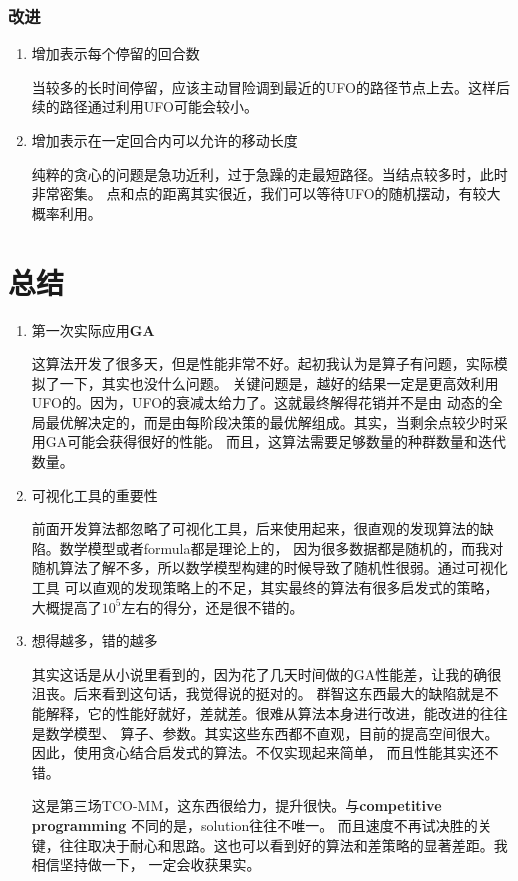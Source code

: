 \documentclass[hyperref,UTF8]{ctexart}
\theoremstyle{definition}
\theoremstyle{remark}
\numberwithin{equation}{subsection}
\newcommand{\Emph}{\textbf}
\begin{document}
\subsubsection{改进}

	\begin{enumerate}[(1)]
		
		\item 增加表示每个停留的回合数
		
		当较多的长时间停留，应该主动冒险调到最近的UFO的路径节点上去。这样后续的路径通过利用UFO可能会较小。
		
		\item 增加表示在一定回合内可以允许的移动长度
		
		纯粹的贪心的问题是急功近利，过于急躁的走最短路径。当结点较多时，此时非常密集。
		点和点的距离其实很近，我们可以等待UFO的随机摆动，有较大概率利用。
		
	\end{enumerate}

\section{总结}
	
	\begin{enumerate}[(1)]
		
		\item 第一次实际应用\Emph{GA}
		
		这算法开发了很多天，但是性能非常不好。起初我认为是算子有问题，实际模拟了一下，其实也没什么问题。
		关键问题是，越好的结果一定是更高效利用UFO的。因为，UFO的衰减太给力了。这就最终解得花销并不是由
		动态的全局最优解决定的，而是由每阶段决策的最优解组成。其实，当剩余点较少时采用GA可能会获得很好的性能。
		而且，这算法需要足够数量的种群数量和迭代数量。
		
		\item 可视化工具的重要性
		
		前面开发算法都忽略了可视化工具，后来使用起来，很直观的发现算法的缺陷。数学模型或者formula都是理论上的，
		因为很多数据都是随机的，而我对随机算法了解不多，所以数学模型构建的时候导致了随机性很弱。通过可视化工具
		可以直观的发现策略上的不足，其实最终的算法有很多启发式的策略，大概提高了$10^5$左右的得分，还是很不错的。
		
		\item 想得越多，错的越多
		
		其实这话是从小说里看到的，因为花了几天时间做的GA性能差，让我的确很沮丧。后来看到这句话，我觉得说的挺对的。
		群智这东西最大的缺陷就是不能解释，它的性能好就好，差就差。很难从算法本身进行改进，能改进的往往是数学模型、
		算子、参数。其实这些东西都不直观，目前的提高空间很大。因此，使用贪心结合启发式的算法。不仅实现起来简单，
		而且性能其实还不错。
		
		这是第三场TCO-MM，这东西很给力，提升很快。与\Emph{competitive programming} 不同的是，solution往往不唯一。
		而且速度不再试决胜的关键，往往取决于耐心和思路。这也可以看到好的算法和差策略的显著差距。我相信坚持做一下，
		一定会收获果实。
		
	\end{enumerate}
	
\end{document}
